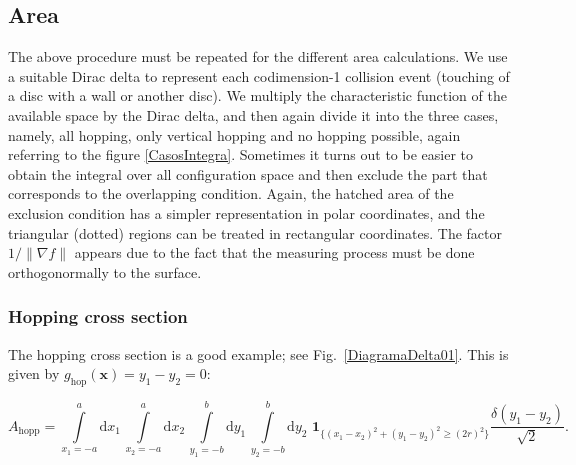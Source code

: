 \documentclass[superscriptaddress,pre,reprint,showpacs,onecolumn]{revtex4-1}
\newcommand{\rd}[1]{\mathrm{d}{#1} \,}
\newcommand{\indicatorsymbol}{\mathbf{1}}
\newcommand{\indicator}[1]{\indicatorsymbol_{ \{   #1 \} } }
\begin{document}
\subsection{Area}

The above procedure must be repeated for the different
area calculations. We use a suitable Dirac delta to represent each codimension-1 collision
event (touching of a disc with a wall or another disc). We multiply the characteristic function of the available space by the Dirac delta, and
then again divide it into the three cases, namely, all hopping, only vertical hopping
and no hopping possible, again referring to the figure \ref{CasosIntegra}.
Sometimes it turns out to be easier to obtain 
the integral  over all configuration space and then exclude the part that
corresponds to the overlapping condition. Again, the hatched area of the exclusion
condition has a simpler representation in polar coordinates, and the triangular
(dotted) regions can be treated in rectangular coordinates.
%
The factor $1/ {\| \nabla f \|}$ appears due to the fact
that the measuring process must be done orthogonormally to the surface. 

\subsubsection{Hopping cross section}

The hopping cross section is a good example; see Fig.~\ref{DiagramaDelta01}. 
This is given by $g_\text{hop}(\mathbf{x}) = y_1 - y_2 = 0$:
\begin{widetext}\label{ahopcart}
\begin{equation}
 A_\text{hopp} = \int \limits_{x_1 = -a}^a \rd {x_1} \int\limits_{x_2 = -a}^a \rd {x_2}
\int\limits_{y_1 = -b}^b \rd {y_1} \int\limits_{y_2 = -b}^b \rd {y_2} \, \indicator{ (x_1-x_2)^2 + (y_1-y_2)^2 \ge (2r)^2 } \frac{\delta(y_1-y_2)}{\sqrt{2}}.
\end{equation}
\end{widetext}
\end{document}
